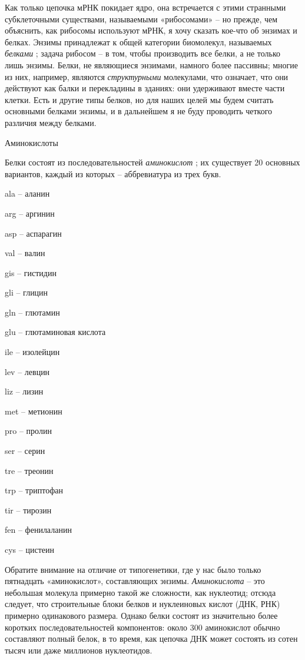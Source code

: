 \documentclass[../main.tex]{subfiles}
\begin{document}
Как только цепочка мРНК покидает ядро, она встречается с этими странными субклеточными существами, называемыми «рибосомами» \--- но прежде, чем объяснить, как рибосомы используют мРНК, я хочу сказать кое-что об энзимах и белках. Энзимы принадлежат к общей категории биомолекул, называемых \emph{белками} ; задача рибосом \--- в том, чтобы производить все белки, а не только лишь энзимы. Белки, не являющиеся энзимами, намного более пассивны; многие из них, например, являются \emph{структурными} молекулами, что означает, что они действуют как балки и перекладины в зданиях: они удерживают вместе части клетки. Есть и другие типы белков, но для наших целей мы будем считать основными белками энзимы, и в дальнейшем я не буду проводить четкого различия между белками.

Аминокислоты

Белки состоят из последовательностей \emph{аминокислот} ; их существует 20 основных вариантов, каждый из которых \--- аббревиатура из трех букв.

ala \--- аланин

arg \--- аргинин

asp \--- аспарагин

val \--- валин

gis \--- гистидин

gli \--- глицин

gln \--- глютамин

glu \--- глютаминовая кислота

ile \--- изолейцин

lev \--- левцин

liz \--- лизин

met \--- метионин

pro \--- пролин

ser \--- серин

tre \--- треонин

trp \--- триптофан

tir \--- тирозин

fen \--- фенилаланин

cys \--- цистеин

Обратите внимание на отличие от типогенетики, где у нас было только пятнадцать «аминокислот», составляющих энзимы. \emph{Аминокислота} \--- это небольшая молекула примерно такой же сложности, как нуклеотид; отсюда следует, что строительные блоки белков и нуклеиновых кислот (ДНК, РНК) примерно одинакового размера. Однако белки состоят из значительно более коротких последовательностей компонентов: около 300 аминокислот обычно составляют полный белок, в то время, как цепочка ДНК может состоять из сотен тысяч или даже миллионов нуклеотидов.
\end{document}
